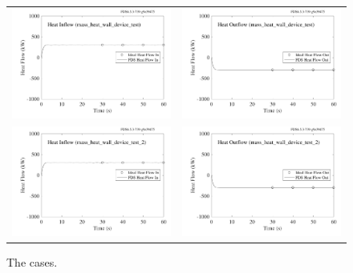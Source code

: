 \documentclass[11pt]{book}
\begin{document}
\begin{figure}[p]
\begin{tabular*}{\textwidth}{lr}
\includegraphics[width=3.1in]{SCRIPT_FIGURES/wall_device_test_heatflow_in} &
\includegraphics[width=3.1in]{SCRIPT_FIGURES/wall_device_test_heatflow_out} \\
\includegraphics[width=3.1in]{SCRIPT_FIGURES/wall_device_test_heatflow_in_2} &
\includegraphics[width=3.1in]{SCRIPT_FIGURES/wall_device_test_heatflow_out_2}
\end{tabular*}
\caption[The  cases]{The  cases.}
\label{mass_heat_wall_device}
\end{figure}
\end{document}
